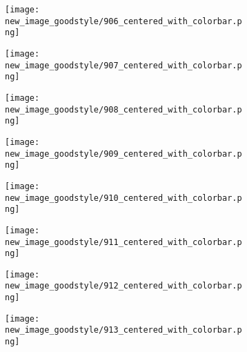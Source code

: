 \documentclass[a4paper,12pt]{article}
\begin{document}
\begin{figure}[H]
  \begin{subfigure}{0.11\textwidth}
    \texttt{[image: new\_image\_goodstyle/906\_centered\_with\_colorbar.png]}
  \end{subfigure}
  \hfill
  \begin{subfigure}{0.11\textwidth}
    \texttt{[image: new\_image\_goodstyle/907\_centered\_with\_colorbar.png]}
  \end{subfigure}
  \hfill
  \begin{subfigure}{0.11\textwidth}
    \texttt{[image: new\_image\_goodstyle/908\_centered\_with\_colorbar.png]}
  \end{subfigure}
  \hfill
  \begin{subfigure}{0.11\textwidth}
    \texttt{[image: new\_image\_goodstyle/909\_centered\_with\_colorbar.png]}
  \end{subfigure}
  \hfill
  \begin{subfigure}{0.11\textwidth}
    \texttt{[image: new\_image\_goodstyle/910\_centered\_with\_colorbar.png]}
  \end{subfigure}
  \hfill
  \begin{subfigure}{0.11\textwidth}
    \texttt{[image: new\_image\_goodstyle/911\_centered\_with\_colorbar.png]}
  \end{subfigure}
  \hfill
  \begin{subfigure}{0.11\textwidth}
    \texttt{[image: new\_image\_goodstyle/912\_centered\_with\_colorbar.png]}
  \end{subfigure}
  \hfill
  \begin{subfigure}{0.11\textwidth}
    \texttt{[image: new\_image\_goodstyle/913\_centered\_with\_colorbar.png]}
  \end{subfigure}
  \hfill
\end{figure}
\end{document}
